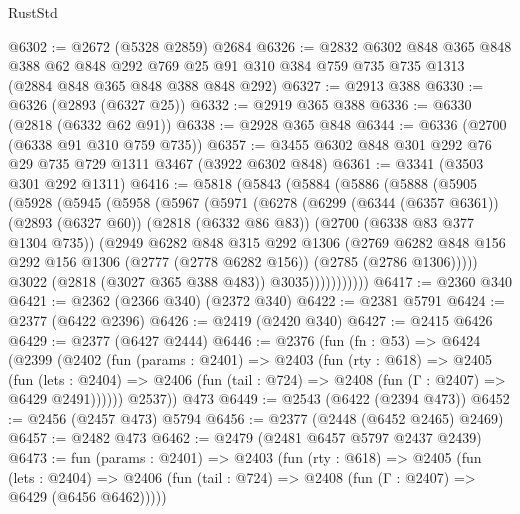 \begin{lexlean}{RustStd}
\begin{coremodule}
@6302 := @2672 (@5328 @2859) @2684
@6326 := @2832
    @6302
    @848
    @365
    @848
    @388
    @62
    @848
    @292
    @769
    @25
    @91
    @310
    @384
    @759
    @735
    @735
    @1313
    (@2884 @848 @365 @848 @388 @848 @292)
@6327 := @2913 @388
@6330 := @6326 (@2893 (@6327 @25))
@6332 := @2919 @365 @388
@6336 := @6330 (@2818 (@6332 @62 @91))
@6338 := @2928 @365 @848
@6344 := @6336 (@2700 (@6338 @91 @310 @759 @735))
@6357 := @3455 @6302 @848 @301 @292 @76 @29 @735 @729 @1311 @3467 (@3922 @6302 @848)
@6361 := @3341 (@3503 @301 @292 @1311)
@6416 := @5818
    (@5843
      (@5884
        (@5886
          (@5888
            (@5905
              (@5928
                (@5945
                  (@5958
                    (@5967
                      (@5971
                        (@6278
                          (@6299
                            (@6344 (@6357 @6361))
                            (@2893 (@6327 @60))
                            (@2818 (@6332 @86 @83))
                            (@2700 (@6338 @83 @377 @1304 @735))
                            (@2949
                              @6282
                              @848
                              @315
                              @292
                              @1306
                              (@2769
                                @6282
                                @848
                                @156
                                @292
                                @156
                                @1306
                                (@2777 (@2778 @6282 @156))
                                (@2785 (@2786 @1306)))))
                          @3022
                          (@2818 (@3027 @365 @388 @483))
                          @3035)))))))))))
@6417 := @2360 @340
@6421 := @2362 (@2366 @340) (@2372 @340)
@6422 := @2381 @5791
@6424 := @2377 (@6422 @2396)
@6426 := @2419 (@2420 @340)
@6427 := @2415 @6426
@6429 := @2377 (@6427 @2444)
@6446 := @2376
    (fun (fn : @53) =>
    @6424
      (@2399
        (@2402
          (fun (params : @2401) =>
          @2403
            (fun (rty : @618) =>
            @2405
              (fun (lets : @2404) =>
              @2406 (fun (tail : @724) => @2408 (fun (Γ : @2407) => @6429 @2491))))))
        @2537))
    @473
@6449 := @2543 (@6422 (@2394 @473))
@6452 := @2456 (@2457 @473) @5794
@6456 := @2377 (@2448 (@6452 @2465) @2469)
@6457 := @2482 @473
@6462 := @2479 (@2481 @6457 @5797 @2437 @2439)
@6473 := fun (params : @2401) =>
  @2403
    (fun (rty : @618) =>
    @2405
      (fun (lets : @2404) =>
      @2406 (fun (tail : @724) => @2408 (fun (Γ : @2407) => @6429 (@6456 @6462)))))

\end{coremodule}
\end{lexlean}
